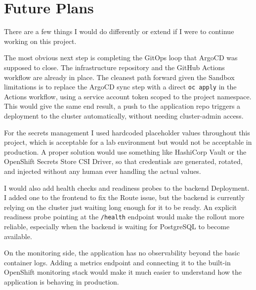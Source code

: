 \section{Future Plans}

There are a few things I would do differently or extend if I were to continue working
on this project.

The most obvious next step is completing the GitOps loop that ArgoCD was supposed to
close. The infrastructure repository and the GitHub Actions workflow are already in place.
The cleanest path forward given the Sandbox limitations is to replace the ArgoCD sync
step with a direct \texttt{oc apply} in the Actions workflow, using a service account
token scoped to the project namespace. This would give the same end result, a push to
the application repo triggers a deployment to the cluster automatically, without needing
cluster-admin access.

For the secrets management I used hardcoded placeholder values throughout this project,
which is acceptable for a lab environment but would not be acceptable in production. A
proper solution would use something like HashiCorp Vault or the OpenShift Secrets Store
CSI Driver, so that credentials are generated, rotated, and injected without any human
ever handling the actual values.

I would also add health checks and readiness probes to the backend Deployment. I added
one to the frontend to fix the Route issue, but the backend is currently relying on the
cluster just waiting long enough for it to be ready. An explicit readiness probe pointing
at the \texttt{/health} endpoint would make the rollout more reliable, especially when
the backend is waiting for PostgreSQL to become available.

On the monitoring side, the application has no observability beyond the basic container
logs. Adding a metrics endpoint and connecting it to the built-in OpenShift monitoring
stack would make it much easier to understand how the application is behaving in
production.
